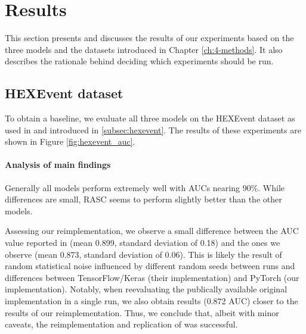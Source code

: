 \chapter{\label{ch:ch5-results}Results}

This section presents and discusses the results of our experiments based on the three models and the datasets introduced in Chapter \ref{ch:4-methods}. It also describes the rationale behind deciding which experiments should be run.

\section{HEXEvent dataset} \label{sec:hexevent_results}
To obtain a baseline, we evaluate all three models on the HEXEvent dataset as used in \cite{dsc} and introduced in \ref{subsec:hexevent}. The results of these experiments are shown in Figure \ref{fig:hexevent_auc}.

\subsubsection{Analysis of main findings}
Generally all models perform extremely well with AUCs nearing 90\%. While differences are small, RASC seems to perform slightly better than the other models.

Assessing our reimplementation, we observe a small difference between the AUC value reported in \cite{dsc} (mean 0.899, standard deviation of 0.18) and the ones we observe (mean 0.873, standard deviation of 0.06). This is likely the result of random statistical noise influenced by different random seeds between runs and differences between TensorFlow/Keras (their implementation) and PyTorch (our implementation). Notably, when reevaluating the publically available original implementation in a single run, we also obtain results (0.872 AUC) closer to the results of our reimplementation. 
Thus, we conclude that, albeit with minor caveats, the reimplementation and replication of \cite{dsc} was successful.

